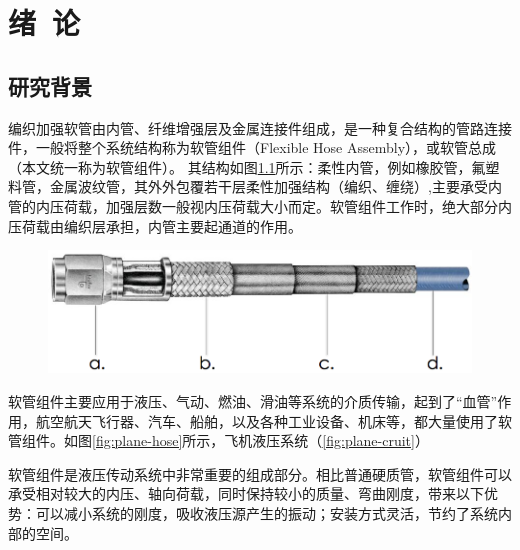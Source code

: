 


\chapter{绪~论}
\label{chap:introduintroduction}
\section{研究背景}
编织加强软管由内管、纤维增强层及金属连接件组成，是一种复合结构的管路连接件，一般将整个系统结构称为软管组件（Flexible Hose Assembly），或软管总成（本文统一称为软管组件）。
其结构如图\ref{fig:hose structure}所示：柔性内管，例如橡胶管，氟塑料管，金属波纹管，其外外包覆若干层柔性加强结构（编织、缠绕）,主要承受内管的内压荷载，加强层数一般视内压荷载大小而定。软管组件工作时，绝大部分内压荷载由编织层承担，内管主要起通道的作用。


\begin{figure}[!htbp]
\centering
\includegraphics[width=0.6\linewidth]{figure/chap1/Hose-Structure}
\label{fig:hose structure}
\end{figure}


软管组件主要应用于液压、气动、燃油、滑油等系统的介质传输，起到了“血管”作用，航空航天飞行器、汽车、船舶，以及各种工业设备、机床等，都大量使用了软管组件。如图\ref{fig:plane-hose}所示，飞机液压系统（\ref{fig:plane-cruit}）

软管组件是液压传动系统中非常重要的组成部分。相比普通硬质管，软管组件可以承受相对较大的内压、轴向荷载，同时保持较小的质量、弯曲刚度，带来以下优势：可以减小系统的刚度，吸收液压源产生的振动；安装方式灵活，节约了系统内部的空间。


